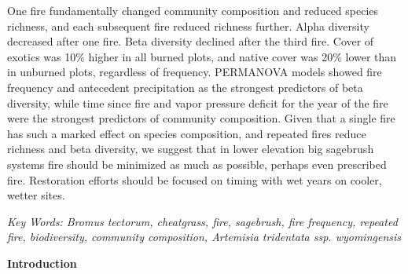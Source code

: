\documentclass[12pt,]{article}
\begin{document}
One fire fundamentally changed community composition and reduced species
richness, and each subsequent fire reduced richness further. Alpha
diversity decreased after one fire. Beta diversity declined after the
third fire. Cover of exotics was 10\% higher in all burned plots, and
native cover was 20\% lower than in unburned plots, regardless of
frequency. PERMANOVA models showed fire frequency and antecedent
precipitation as the strongest predictors of beta diversity, while time
since fire and vapor pressure deficit for the year of the fire were the
strongest predictors of community composition. Given that a single fire
has such a marked effect on species composition, and repeated fires
reduce richness and beta diversity, we suggest that in lower elevation
big sagebrush systems fire should be minimized as much as possible,
perhaps even prescribed fire. Restoration efforts should be focused on
timing with wet years on cooler, wetter sites.

\emph{Key Words: Bromus tectorum, cheatgrass, fire, sagebrush, fire
frequency, repeated fire, biodiversity, community composition, Artemisia
tridentata ssp. wyomingensis}

\textbf{Introduction}
\end{document}
